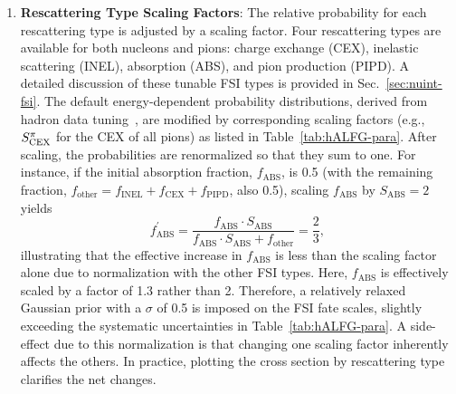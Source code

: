 \begin{enumerate}
        \item \textbf{Rescattering Type Scaling Factors}: 
        The relative probability for each rescattering type is adjusted by a scaling factor. 
        Four rescattering types are available for both nucleons and pions: charge exchange (CEX), inelastic scattering (INEL), absorption (ABS), and pion production (PIPD). 
        A detailed discussion of these tunable FSI types is provided in Sec.~\ref{sec:nuint-fsi}. 
        The default energy-dependent probability distributions, derived from hadron data tuning~\cite{LADS:1999dyv,Navon:1983xj,Carroll:1976hj,Clough:1974qt,BAUHOFF1986429}, are modified by corresponding scaling factors (e.g., $S_\textrm{CEX}^{\pi}$ for the CEX of all pions) as listed in Table~\ref{tab:hALFG-para}. 
        After scaling, the probabilities are renormalized so that they sum to one. 
        For instance, if the initial absorption fraction, $f_\textrm{ABS}$, is 0.5 (with the remaining fraction, $f_\textrm{other}=f_\textrm{INEL}+f_\textrm{CEX}+f_\textrm{PIPD}$, also 0.5), scaling $f_\textrm{ABS}$ by $S_\textrm{ABS}=2$ yields
        \begin{equation}
            f^\prime_\textrm{ABS} = \frac{f_\textrm{ABS} \cdot S_\textrm{ABS}}{f_\textrm{ABS} \cdot S_\textrm{ABS}+f_\textrm{other}} = \frac{2}{3},
        \end{equation}
        illustrating that the effective increase in $f_\textrm{ABS}$ is less than the scaling factor alone due to normalization with the other FSI types.
        Here, $f_\textrm{ABS}$ is effectively scaled by a factor of 1.3 rather than 2. 
        Therefore, a relatively relaxed Gaussian prior with a $\sigma$ of 0.5 is imposed on the FSI fate scales, slightly exceeding the systematic uncertainties in Table~\ref{tab:hALFG-para}.
        A side-effect due to this normalization is that changing one scaling factor inherently affects the others.
        In practice, plotting the cross section by rescattering type clarifies the net changes.
    \end{enumerate}
    
